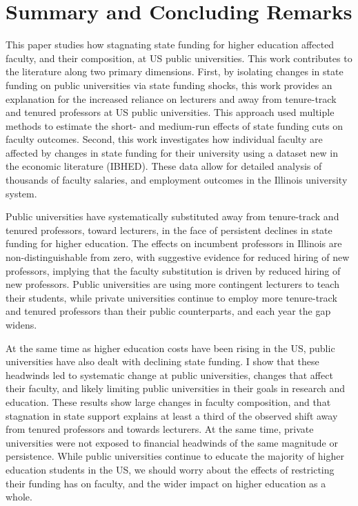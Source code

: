 \section{Summary and Concluding Remarks}
\label{sec:conclusion}

This paper studies how stagnating state funding for higher education affected faculty, and their composition, at US public universities.
This work contributes to the literature along two primary dimensions.
First, by isolating changes in state funding on public universities via state funding shocks, this work provides an explanation for the increased reliance on lecturers and away from tenure-track and tenured professors at US public universities.
This approach used multiple methods to estimate the short- and medium-run effects of state funding cuts on faculty outcomes.
Second, this work investigates how individual faculty are affected by changes in state funding for their university using a dataset new in the economic literature (IBHED).
These data allow for detailed analysis of thousands of faculty salaries, and employment outcomes in the Illinois university system.

Public universities have systematically substituted away from tenure-track and tenured professors, toward lecturers, in the face of persistent declines in state funding for higher education.
The effects on incumbent professors in Illinois are non-distinguishable from zero, with suggestive evidence for reduced hiring of new professors, implying that the faculty substitution is driven by reduced hiring of new professors.
Public universities are using more contingent lecturers to teach their students, while private universities continue to employ more tenure-track and tenured professors than their public counterparts, and each year the gap widens.

At the same time as higher education costs have been rising in the US, public universities have also dealt with declining state funding.
I show that these headwinds led to systematic change at public universities, changes that affect their faculty, and likely limiting public universities in their goals in research and education.
These results show large changes in faculty composition, and that stagnation in state support explains at least a third of the observed shift away from tenured professors and towards lecturers.
At the same time, private universities were not exposed to financial headwinds of the same magnitude or persistence.
While public universities continue to educate the majority of higher education students in the US, we should worry about the effects of restricting their funding has on faculty, and the wider impact on higher education as a whole.
